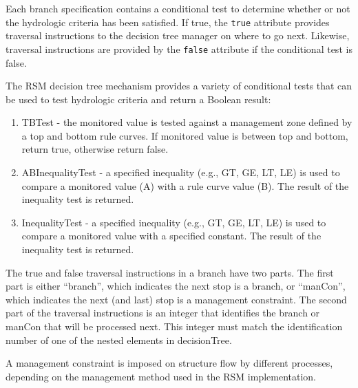 Each branch specification contains a conditional test to
determine whether or not the hydrologic criteria has been satisfied.
If true, the {\tt true} attribute provides traversal instructions to
the decision tree manager on where to go next.  Likewise, traversal
instructions are provided by the {\tt false} attribute if the
conditional test is false.  

The RSM decision tree mechanism provides a variety of conditional tests
that can be used to test hydrologic criteria and return a Boolean
result:

\begin{enumerate}

 \item TBTest \-- the monitored value is tested against a management
 zone defined by a top and bottom rule curves.  If monitored value is
 between top and bottom, return true, otherwise return false.

 \item ABInequalityTest \-- a specified inequality (e.g., GT, GE, LT,
 LE) is used to compare a monitored value (A) with a rule curve value
 (B).  The result of the inequality test is returned.

 \item InequalityTest \-- a specified inequality (e.g., GT, GE, LT,
 LE) is used to compare a monitored value with a specified constant.
 The result of the inequality test is returned.

\end{enumerate}

The true and false traversal instructions in a branch have two parts.
The first part is either ``branch'', which indicates the next stop is
a branch, or ``manCon'', which indicates the next (and last) stop is a
management constraint.  The second part of the traversal instructions
is an integer that identifies the branch or manCon that will be processed
next. This integer must match the identification number of one of the
nested elements in decisionTree.

A management constraint is imposed on structure flow by different
processes, depending on the management method used in the RSM
implementation.

